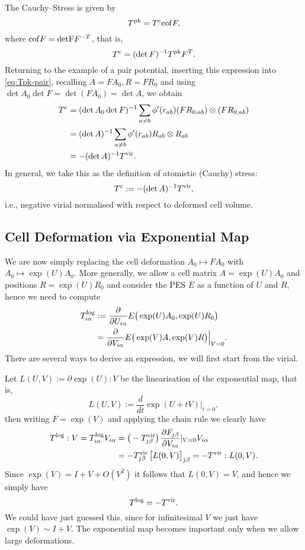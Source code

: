 \documentclass[11pt,a4paper]{amsart}
\begin{document}
The Cauchy--Stress is given by
\[
   T^{\rm pk} = T^{\rm c} {\rm cof} F,
\]
where ${\rm cof} F = {\rm det F} F^{-T}$,  that is,
\[
   T^{\rm c} = (\det F)^{-1} T^{\rm pk} F^T.
\]
%
Returning to the example of a pair potential, inserting this expression into
\eqref{eq:Tpk-pair}, recalling $A = F A_0, R = F R_0$ and using $\det A_0 \det F
= \det (F A_0) = \det A$,  we obtain
%
\begin{align*}
   T^{\rm c} &= (\det A_0 \det F)^{-1} \sum_{a \neq b} \phi'(r_{ab}) (F R_{0,ab}) \otimes (F R_{0,ab})  \\
   &= (\det A)^{-1} \sum_{a \neq b} \phi'(r_{ab}) R_{ab} \otimes R_{ab} \\
   &= - (\det A)^{-1} T^{\rm vir}.
\end{align*}
%
In general, we take this as the definition of atomistic (Cauchy) stress:
%
\begin{equation} \label{eq:defn-at-stress}
   T^{\rm c} := - (\det A)^{-1} T^{\rm vir},
\end{equation}
i.e., negative virial normalised with respect to deformed cell volume.

\subsection*{Cell Deformation via Exponential Map}
%
We are now simply replacing the cell deformation  $A_0 \mapsto F A_0$ with $A_0
\mapsto \exp(U) A_0$. More generally, we allow a cell matrix $A = \exp(U) A_0$
and positions $R = \exp(U) R_0$ and consider the PES $E$ as a function of $U$
and $R$, hence we need to compute
%
\begin{align*}
   T^{\rm log}_{i\alpha}
   &:=  \frac{\partial}{\partial U_{i\alpha}} E\big( \exp(U) A_0, \exp(U) R_0 \big) \\
   &= \frac{\partial}{\partial V_{i\alpha}} E\big( \exp(V) A, \exp(V) R \big) \Big|_{V = 0}.
\end{align*}
There are several ways to derive an expression, we will first start from the
virial.

Let $L(U, V) := \partial \exp(U) : V$ be the linearisation of the exponential
map, that is,
\[
   L(U, V) := \frac{d}{dt} \exp(U + t V) \Big|_{t = 0},
\]
then writing $F = \exp(V)$ and applying the chain rule we clearly have
%
\begin{align*}
   T^{\rm log} : V = T^{\rm log}_{i\alpha} V_{i\alpha}
   &=
   \big(-T^{\rm vir}_{j\beta}\big)\,
   \frac{\partial F_{j\beta}}{\partial V_{i\alpha}} |_{V=0} V_{i\alpha} \\
   &=
   - T^{\rm vir}_{j\beta} \, \big[L(0, V) \big]_{j\beta}
   = - T^{\rm vir} : L(0, V).
\end{align*}
Since $\exp(V) = I + V + O(V^2)$ it follows that $L(0, V) = V$, and hence we
simply have
\[
   T^{\rm log} = - T^{\rm vir}.
\]
We could have just guessed this, since for infinitesimal $V$ we just
have $\exp(V) \sim I + V$. The exponential map becomes important
only when we allow large deformations.
\end{document}
